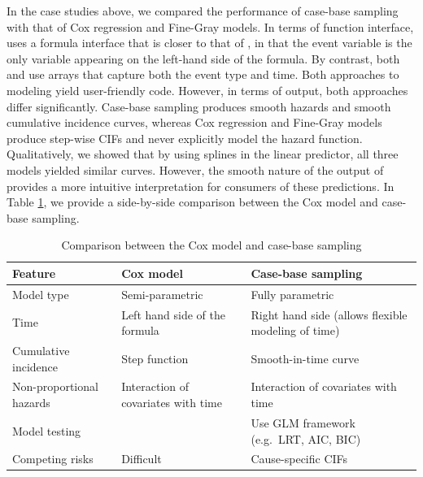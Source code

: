 \documentclass[
]{jss}
\begin{document}
In the case studies above, we compared the performance of case-base
sampling with that of Cox regression and Fine-Gray models. In terms of
function interface,  uses a formula interface that is
closer to that of , in that the event variable is the only
variable appearing on the left-hand side of the formula. By contrast,
both  and  use arrays
that capture both the event type and time. Both approaches to modeling
yield user-friendly code. However, in terms of output, both approaches
differ significantly. Case-base sampling produces smooth hazards and
smooth cumulative incidence curves, whereas Cox regression and Fine-Gray
models produce step-wise CIFs and never explicitly model the hazard
function. Qualitatively, we showed that by using splines in the linear
predictor, all three models yielded similar curves. However, the smooth
nature of the output of  provides a more intuitive
interpretation for consumers of these predictions. In Table
\ref{tab:compCBvsCox}, we provide a side-by-side comparison between the
Cox model and case-base sampling.

\begin{table}
\caption{\label{tab:compCBvsCox}Comparison between the Cox model and case-base sampling}
\centering
\begin{tabular}[t]{llp{5cm}}
\toprule
Feature & Cox model & Case-base sampling\\
\midrule
Model type & Semi-parametric & Fully parametric\\
Time & Left hand side of the formula & Right hand side (allows flexible modeling of time)\\
Cumulative incidence & Step function & Smooth-in-time curve\\
Non-proportional hazards & Interaction of covariates with time & Interaction of covariates with time\\
Model testing &  & Use GLM framework \newline (e.g.\ LRT, AIC, BIC)\\
\addlinespace
Competing risks & Difficult & Cause-specific CIFs\\
\bottomrule
\end{tabular}
\end{table}
\end{document}
